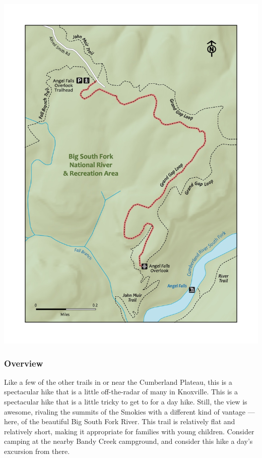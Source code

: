 \documentclass[
  letterpaper,
  DIV=11,
  numbers=noendperiod]{scrartcl}
\begin{document}
\includegraphics{maps/trail-18-map.jpeg}

\hypertarget{overview-17}{%
\subsubsection{Overview}\label{overview-17}}

Like a few of the other trails in or near the Cumberland Plateau, this
is a spectacular hike that is a little off-the-radar of many in
Knoxville. This is a spectacular hike that is a little tricky to get to
for a day hike. Still, the view is awesome, rivaling the summits of the
Smokies with a different kind of vantage --- here, of the beautiful Big
South Fork River. This trail is relatively flat and relatively short,
making it appropriate for families with young children. Consider camping
at the nearby Bandy Creek campground, and consider this hike a day's
excursion from there.
\end{document}
